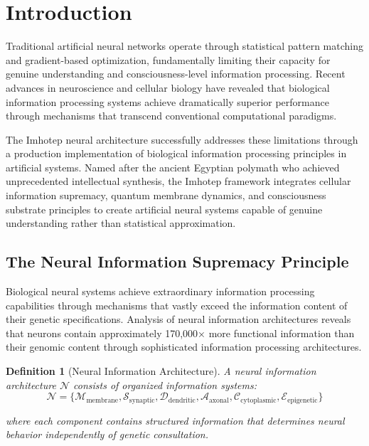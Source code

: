 \documentclass[12pt,a4paper]{article}
\newtheorem{definition}[theorem]{Definition}
\theoremstyle{remark}
\begin{document}
\section{Introduction}

Traditional artificial neural networks operate through statistical pattern matching and gradient-based optimization, fundamentally limiting their capacity for genuine understanding and consciousness-level information processing. Recent advances in neuroscience and cellular biology have revealed that biological information processing systems achieve dramatically superior performance through mechanisms that transcend conventional computational paradigms.

The Imhotep neural architecture successfully addresses these limitations through a production implementation of biological information processing principles in artificial systems. Named after the ancient Egyptian polymath who achieved unprecedented intellectual synthesis, the Imhotep framework integrates cellular information supremacy, quantum membrane dynamics, and consciousness substrate principles to create artificial neural systems capable of genuine understanding rather than statistical approximation.

\subsection{The Neural Information Supremacy Principle}

Biological neural systems achieve extraordinary information processing capabilities through mechanisms that vastly exceed the information content of their genetic specifications. Analysis of neural information architectures reveals that neurons contain approximately 170,000× more functional information than their genomic content through sophisticated information processing architectures.

\begin{definition}[Neural Information Architecture]
A neural information architecture $\mathcal{N}$ consists of organized information systems:
$$\mathcal{N} = \{\mathcal{M}_{\text{membrane}}, \mathcal{S}_{\text{synaptic}}, \mathcal{D}_{\text{dendritic}}, \mathcal{A}_{\text{axonal}}, \mathcal{C}_{\text{cytoplasmic}}, \mathcal{E}_{\text{epigenetic}}\}$$

where each component contains structured information that determines neural behavior independently of genetic consultation.
\end{definition}
\end{document}
